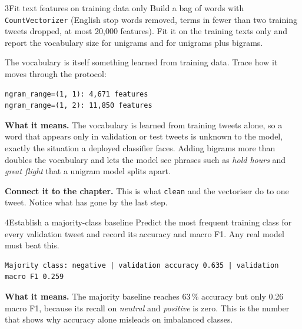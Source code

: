 \begin{labquestion}{3}{Fit text features on training data only}
Build a bag of words with \texttt{CountVectorizer} (English stop words removed, terms in fewer than two training tweets dropped, at most 20,000 features). Fit it on the training texts only and report the vocabulary size for unigrams and for unigrams plus bigrams.
\end{labquestion}
\begin{labanswer}
The vocabulary is itself something learned from training data. Trace how it moves through the protocol:



\begin{refoutput}
\begin{lstlisting}[style=utpterminal]
ngram_range=(1, 1): 4,671 features
ngram_range=(1, 2): 11,850 features
\end{lstlisting}
\end{refoutput}

\textbf{What it means.} The vocabulary is learned from training tweets alone, so a word that appears only in validation or test tweets is unknown to the model, exactly the situation a deployed classifier faces. Adding bigrams more than doubles the vocabulary and lets the model see phrases such as \emph{hold hours} and \emph{great flight} that a unigram model splits apart.
\end{labanswer}

\textbf{Connect it to the chapter.} This is what \texttt{clean} and the vectoriser do to one tweet. Notice what has gone by the last step.


\begin{labquestion}{4}{Establish a majority-class baseline}
Predict the most frequent training class for every validation tweet and record its accuracy and macro F1. Any real model must beat this.
\end{labquestion}
\begin{labanswer}

\begin{refoutput}
\begin{lstlisting}[style=utpterminal]
Majority class: negative | validation accuracy 0.635 | validation macro F1 0.259
\end{lstlisting}
\end{refoutput}

\textbf{What it means.} The majority baseline reaches 63\,\% accuracy but only 0.26 macro F1, because its recall on \emph{neutral} and \emph{positive} is zero. This is the number that shows why accuracy alone misleads on imbalanced classes.
\end{labanswer}

